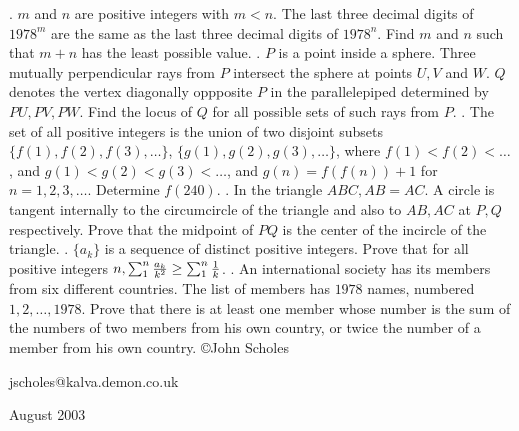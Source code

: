 \nopagenumbers
{}
\vskip 25pt
. $m$ and $n$ are positive integers with $m<n$. The last three decimal digits of $1978^m$ are the same as the last three decimal digits of $1978^n$. Find $m$ and $n$ such that $m+n$ has the least possible value.
\vskip 12pt
. $P$ is a point inside a sphere. Three mutually perpendicular rays from $P$ intersect the sphere at points $U,V$ and $W$. $Q$ denotes the vertex diagonally oppposite $P$ in the parallelepiped determined by $PU,PV,PW$. Find the locus of $Q$ for all possible sets of such rays from $P$.
\vskip 12pt
. The set of all positive integers is the union of two disjoint subsets $\{f(1),f(2),f(3),\ldots\}$, $\{g(1),g(2),g(3),\ldots\}$, where $f(1)<f(2)<\ldots$, and $g(1)<g(2)<g(3)<\ldots$, and $g(n)=f(f(n))+1$ for $n=1,2,3,\ldots$. Determine $f(240)$.
\vskip 12pt
. In the triangle $ABC, AB=AC$. A circle is tangent internally to the circumcircle of the triangle and also to $AB,AC$ at $P,Q$ respectively. Prove that the midpoint of $PQ$ is the center of the incircle of the triangle.
\vskip 12pt
. $\{a_k\}$ is a sequence of distinct positive integers. Prove that for all positive integers $n, \sum_1^n{a_k\over k^2}\ge\sum_1^n{1\over k}$.
\vskip 12pt
. An international society has its members from six different countries. The list of members has $1978$ names, numbered $1,2,\ldots,1978$. Prove that there is at least one member whose number is the sum of the numbers of two members from his own country, or twice the number of a member from his own country.
\vskip 20pt
\noindent \copyright John Scholes

\noindent jscholes@kalva.demon.co.uk

 August 2003

\bye
